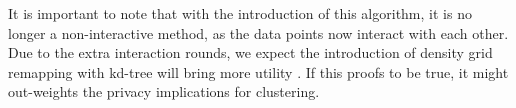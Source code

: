 


It is important to note that with the introduction of this algorithm, it is no longer a non-interactive method, as the data points now interact with each other.
Due to the extra interaction rounds, we expect the introduction of density grid remapping with kd-tree will bring more utility \citep{wang_comprehensive_2020, xiongComprehensiveSurveyLocal2020}.
If this proofs to be true, it might out-weights the privacy implications for clustering. 
\newpage





